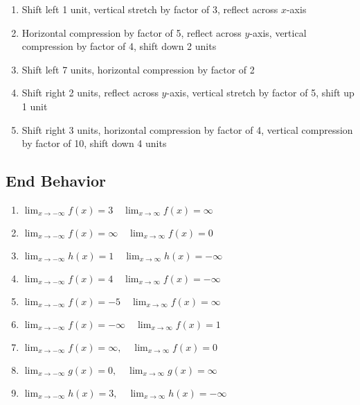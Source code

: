 \begin{enumerate}
	\item Shift left 1 unit, vertical stretch by factor of 3, reflect across $x$-axis
	\item Horizontal compression by factor of 5, reflect across $y$-axis, vertical compression by factor of 4, shift down 2 units
	\item Shift left 7 units, horizontal compression by factor of 2
	\item Shift right 2 units, reflect across $y$-axis, vertical stretch by factor of 5, shift up 1 unit
	\item Shift right 3 units, horizontal compression by factor of 4, vertical compression by factor of 10, shift down 4 units
\end{enumerate}

\subsection*{End Behavior}
\begin{enumerate}
	\item $\displaystyle \lim_{x \to -\infty} f(x) = 3 \quad \lim_{x \to \infty} f(x) = \infty$
	\item $\displaystyle \lim_{x \to -\infty} f(x) = \infty \quad \lim_{x \to \infty} f(x) =0$ 
	\item $\displaystyle \lim_{x \to -\infty} h(x) = 1 \quad \lim_{x \to \infty} h(x) = - \infty$
	\item $\displaystyle \lim_{x \to -\infty} f(x) = 4 \quad \lim_{x \to \infty} f(x) = -\infty$
    \item $\displaystyle \lim_{x \to -\infty} f(x) = -5 \quad \lim_{x \to \infty} f(x) = \infty$
    \item $\displaystyle \lim_{x \to -\infty} f(x) = -\infty \quad \lim_{x \to \infty} f(x) = 1$
	\item $\displaystyle \lim_{x \to -\infty} f(x) = \infty, \quad \lim_{x \to \infty} f(x) = 0$    
	\item $\displaystyle \lim_{x \to -\infty} g(x) = 0, \quad \lim_{x \to \infty} g(x) = \infty$    
	\item  $\displaystyle \lim_{x \to -\infty} h(x) = 3, \quad \lim_{x \to \infty} h(x) = -\infty$
\end{enumerate}
